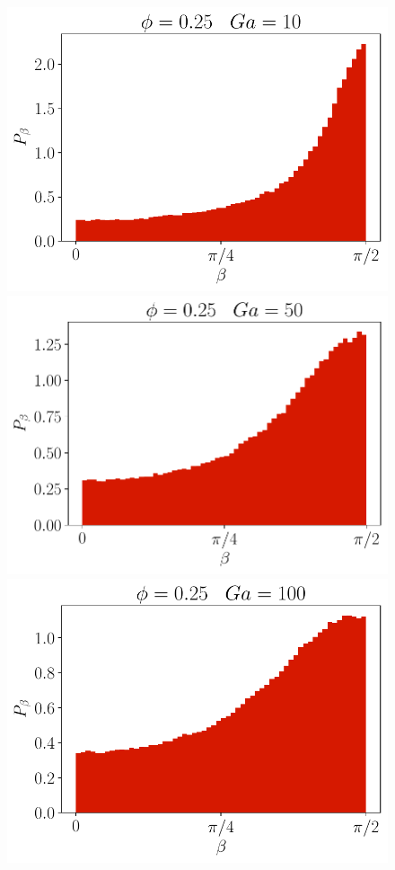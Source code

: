 \begin{figure}[h!]
    \includegraphics[height =\size]{image/N_10/beta/2DMAP_beta_dmin_10_Bo1PHI0_25mu_r0_042Ga10.pdf}
    \includegraphics[height =\size]{image/N_10/beta/2DMAP_beta_dmin_10_Bo1PHI0_25mu_r0_042Ga50.pdf}
    \includegraphics[height =\size]{image/N_10/beta/2DMAP_beta_dmin_10_Bo1PHI0_25mu_r0_042Ga100.pdf}

\end{figure}
